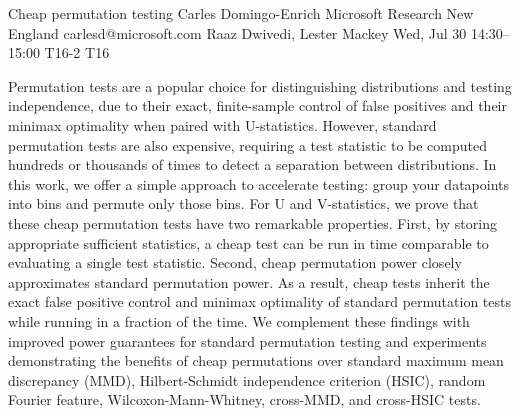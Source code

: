 \begin{talk}
  {Cheap permutation testing}%
  {Carles Domingo-Enrich}%
  {Microsoft Research New England}%
  {carlesd@microsoft.com}%
  {Raaz Dwivedi, Lester Mackey}%
  {}%
  {Wed, Jul 30 14:30--15:00}%
  {T16-2}%
  {T16}%
  
    
   
Permutation tests are a popular choice for distinguishing distributions and testing independence, due to their exact, finite-sample control of false positives and their minimax optimality when paired with U-statistics. However, standard permutation tests are also expensive, requiring a test statistic to be computed hundreds or thousands of times to detect a separation between distributions. In this work, we offer a simple approach to accelerate testing: group your datapoints into bins and permute only those bins. For U and V-statistics, we prove that these cheap permutation tests have two remarkable properties. First, by storing appropriate sufficient statistics, a cheap test can be run in time comparable to evaluating a single test statistic. Second, cheap permutation power closely approximates standard permutation power. As a result, cheap tests inherit the exact false positive control and minimax optimality of standard permutation tests while running in a fraction of the time. We complement these findings with improved power guarantees for standard permutation testing and experiments demonstrating the benefits of cheap permutations over standard maximum mean discrepancy (MMD), Hilbert-Schmidt independence criterion (HSIC), random Fourier feature, Wilcoxon-Mann-Whitney, cross-MMD, and cross-HSIC tests.



\end{talk}

